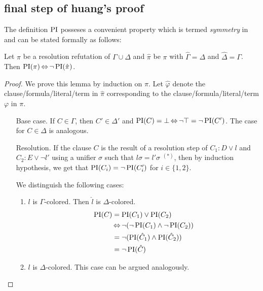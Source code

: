 \subsection{final step of huang's proof}

The definition $\operatorname{PI}$ posseses a convenient property which is termed \emph{symmetry} in \cite[Definition 5]{interpolantStrenth} and can be stated formally as follows:

\newcommand{\primex}[1]{\ensuremath{\hat{#1}}}
\begin{lemma}
	\label{lemma:symmetry}
	Let $\pi$ be a resolution refutation of $\Gamma \cup \Delta$ and
	$\primex\pi$ be $\pi$ with $\primex\Gamma = \Delta$ and $\primex\Delta = \Gamma$.
	Then $\PI(\pi) \semiff \lnot \PI(\primex\pi)$.
\end{lemma}
\begin{proof}
	We prove this lemma by induction on $\pi$.
	Let $\primex\varphi$ denote the clause/formula/literal/term in $\primex\pi$ corresponding to the clause/formula/literal/term $\varphi$ in $\pi$.

	\newcommand{\p}[1]{\primex{#1}}
	\begin{itemize}
		\item[Base case.]
			If $C \in \Gamma$, then $C' \in \Delta'$ and $\operatorname{PI}(C) = \bot \operatorname{\Leftrightarrow} \lnot \top = \lnot \operatorname{PI}(C')$. 
			The case for $C\in \Delta$ is analogous.

		\item[Resolution.]
			If the clause $C$ is the result of a resolution step of $C_1: D \lor l$ and $C_2: E \lor \lnot l'$ using a unifier $\sigma$ such that $l\sigma = l'\sigma$ $^{(*)}$, then by induction hypothesis, we get that
			$\operatorname{PI}(C_i) = \lnot \operatorname{PI}(C'_i)$ for $i\in \{1,2\}$.

			We distinguish the following cases:
			\begin{enumerate}
					\item $l$ is $\Gamma$-colored. Then $\primex l$ is $\Delta$-colored.
						\begin{align*}
							\PI(C) &= \PI(C_1) \lor \PI(C_2)\\
														 &\semiff \lnot ( \lnot \PI(C_1) \land \lnot \PI(C_2) )\\
														 &= \lnot ( \PI(\primex C_1) \land \PI(\primex C_2) ) \\
														 &= \lnot \PI(\primex C)  
						\end{align*}
					\item $l$ is $\Delta$-colored. This case can be argued analogously.


\end{enumerate}
\end{itemize}
\end{proof}
